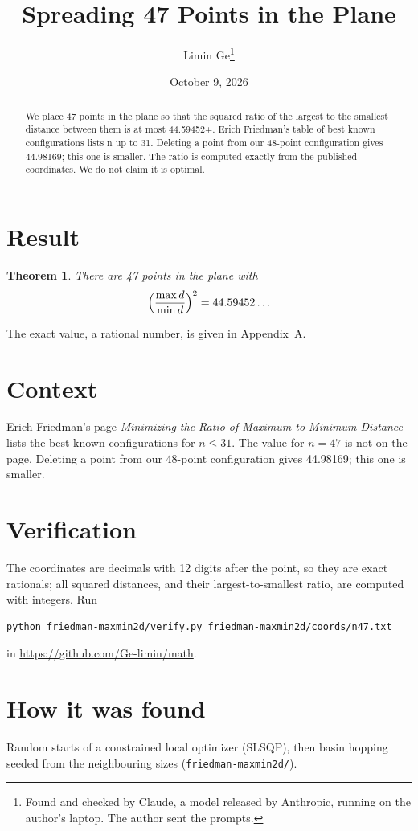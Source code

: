 \documentclass[11pt,a4paper]{article}
\title{Spreading 47 Points in the Plane}
\author{Limin Ge\thanks{Found and checked by Claude, a model released by Anthropic, running on the author's laptop. The author sent the prompts.}}
\date{October 9, 2026}
\newtheorem*{theorem}{Theorem}
\begin{document}
\maketitle
\begin{abstract}
We place 47 points in the plane so that the squared ratio of the largest to the smallest distance between them is at most 44.59452+. Erich Friedman's table of best known configurations lists n up to 31. Deleting a point from our 48-point configuration gives 44.98169; this one is smaller. The ratio is computed exactly from the published coordinates. We do not claim it is optimal.
\end{abstract}

\section{Result}
\begin{theorem}
There are 47 points in the plane with
\[ \Bigl(\frac{\max d}{\min d}\Bigr)^2 = 44.59452\ldots \]
\end{theorem}
The exact value, a rational number, is given in Appendix~A.


\section{Context}
Erich Friedman's page \emph{Minimizing the Ratio of Maximum to Minimum Distance} lists the best known configurations for $n\le 31$. The value for $n=47$ is not on the page. Deleting a point from our 48-point configuration gives 44.98169; this one is smaller.


\section{Verification}
The coordinates are decimals with 12 digits after the point, so they are exact rationals; all squared distances, and their largest-to-smallest ratio, are computed with integers. Run
\begin{verbatim}
python friedman-maxmin2d/verify.py friedman-maxmin2d/coords/n47.txt
\end{verbatim}
in \url{https://github.com/Ge-limin/math}.


\section{How it was found}
Random starts of a constrained local optimizer (SLSQP), then basin hopping seeded from the neighbouring sizes (\texttt{friedman-maxmin2d/}).
\end{document}
